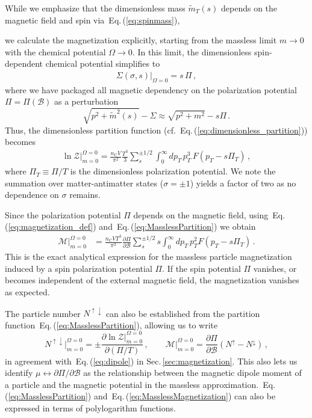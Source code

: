 \documentclass[epjST]{svjour}
\newcommand{\req}[1]{Eq.\,(\ref{#1})}
\newcommand{\rsec}[1]{Sec.\,{\ref{#1}}}
\begin{document}
While we emphasize that the dimensionless mass \(\tilde{m}_{T}(s)\) depends on the magnetic field and spin via~\req{eq:spinmass}, {\color{blue}we calculate the magnetization explicitly, starting from the massless limit \(m\to 0\) with the chemical potential \(\Omega\to0\). In this limit, the dimensionless spin-dependent chemical potential simplifies to
\begin{align}
\Sigma(\sigma,s)\vert_{\Omega=0} = s\,\Pi\,,
\end{align}
where we have packaged all magnetic dependency on the polarization potential \(\Pi=\Pi(\mathcal{B})\) as a perturbation
\begin{equation}
\sqrt{p^{2}+\tilde{m}^{2}(s)}-\Sigma\approx\sqrt{p^{2}+m^{2}}-s\Pi\,.
\end{equation}
Thus, the dimensionless partition function (cf.~\req{eq:dimensionless_partition}) becomes
\begin{align}
\label{eq:MasslessPartition}
\ln\mathcal{Z}\vert_{m=0}^{\Omega=0} 
= \frac{n_\mathrm{C} V}{\pi^{2}} \frac{T^{3}}{3} \sum_{s}^{\pm1/2}\int_{0}^{\infty} dp_{T} \, p_{T}^{3} \, F\left(p_{T} - s\Pi_{T}\right)\,,
\end{align}
where \(\Pi_{T}\equiv\Pi/T\) is the dimensionless polarization potential. We note the summation over matter-antimatter states (\(\sigma=\pm1\)) yields a factor of two as no dependence on \(\sigma\) remains.

Since the polarization potential \(\Pi\) depends on the magnetic field, using~\req{eq:magnetization_def} and~\req{eq:MasslessPartition} we obtain
\begin{align}
\label{eq:MasslessMagnetization}
\mathcal{M}\vert_{m=0}^{\Omega=0} &= \frac{n_\mathrm{C}VT^{3}}{\pi^{2}}\frac{\partial\Pi}{\partial\mathcal{B}}\sum_{s}^{\pm 1/2}s\int_{0}^{\infty}dp_{T}\,p_{T}^{2}F\left(p_{T}-s\Pi_{T}\right)\,.
\end{align}
This is the exact analytical expression for the massless particle magnetization induced by a spin polarization potential \(\Pi\). If the spin potential \(\Pi\) vanishes, or becomes independent of the external magnetic field, the magnetization vanishes as expected.

The particle number \(N^{\uparrow\downarrow}\) can also be established from the partition function~\req{eq:MasslessPartition}, allowing us to write
\begin{equation}
N^{\uparrow\downarrow}\vert_{m=0}^{\Omega=0} = \pm\frac{\partial\ln\mathcal{Z}\vert_{m=0}^{\Omega=0}}{\partial(\Pi/T)}\,,\qquad
\mathcal{M}\vert_{m=0}^{\Omega=0} = \frac{\partial\Pi}{\partial\mathcal{B}}\left(N^{\uparrow}-N^{\downarrow}\right)\,,
\end{equation}
in agreement with~\req{eq:dipole} in \rsec{sec:magnetization}. This also lets us identify \(\mu\leftrightarrow\partial\Pi/\partial\mathcal{B}\) as the relationship between the magnetic dipole moment of a particle and the magnetic potential in the massless approximation.~\req{eq:MasslessPartition} and~\req{eq:MasslessMagnetization} can also be expressed in terms of polylogarithm functions.

}
\end{document}

